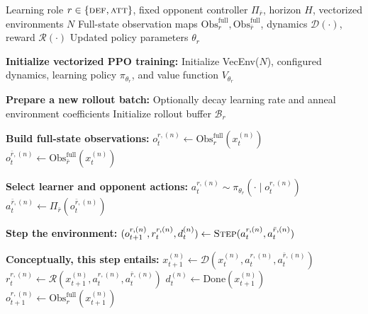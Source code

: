 \begin{algorithm}[H]
\caption{Single-Phase PPO Update with Full-State Observations}
\label{alg:ppo_full_obs}
\begin{algorithmic}[1]
\Require Learning role $r\in\{\textsc{def},\textsc{att}\}$, fixed opponent controller $\Pi_{\bar r}$, horizon $H$, vectorized environments $N$
\Require Full-state observation maps $\mathrm{Obs}^{\mathrm{full}}_r,\mathrm{Obs}^{\mathrm{full}}_{\bar r}$, dynamics $\mathcal{D}(\cdot)$, reward $\mathcal{R}(\cdot)$
\Ensure Updated policy parameters $\theta_r$

\State \textbf{Initialize vectorized PPO training:}
\State \hspace{1em} Initialize VecEnv($N$), configured dynamics, learning policy $\pi_{\theta_r}$, and value function $V_{\theta_r}$

  \State \textbf{Prepare a new rollout batch:}
  \State \hspace{1em} Optionally decay learning rate and anneal environment coefficients
  \State \hspace{1em} Initialize rollout buffer $\mathcal{B}_r$

    \State \textbf{Build full-state observations:}
    \State \hspace{1em} $o_t^{r,(n)} \leftarrow \mathrm{Obs}^{\mathrm{full}}_r(x_t^{(n)})$
    \State \hspace{1em} $o_t^{\bar r,(n)} \leftarrow \mathrm{Obs}^{\mathrm{full}}_{\bar r}(x_t^{(n)})$

    \State \textbf{Select learner and opponent actions:}
    \State \hspace{1em} $a_t^{r,(n)} \sim \pi_{\theta_r}(\cdot \mid o_t^{r,(n)})$
    \State \hspace{1em} $a_t^{\bar r,(n)} \leftarrow \Pi_{\bar r}(o_t^{\bar r,(n)})$

    \State \textbf{Step the environment:}
    \State \hspace{1em} $(o_{t+1}^{r,(n)}, r_t^{r,(n)}, d_t^{(n)}) \leftarrow \textsc{Step}(a_t^{r,(n)}, a_t^{\bar r,(n)})$

    \State \textbf{Conceptually, this step entails:}
    \State \hspace{2em} $x_{t+1}^{(n)} \leftarrow \mathcal{D}\!\left(x_t^{(n)}, a_t^{r,(n)}, a_t^{\bar r,(n)}\right)$
    \State \hspace{2em} $r_t^{r,(n)} \leftarrow \mathcal{R}\!\left(x_{t+1}^{(n)}, a_t^{r,(n)}, a_t^{\bar r,(n)}\right)$
    \State \hspace{2em} $d_t^{(n)} \leftarrow \mathrm{Done}\!\left(x_{t+1}^{(n)}\right)$
    \State \hspace{2em} $o_{t+1}^{r,(n)} \leftarrow \mathrm{Obs}^{\mathrm{full}}_r(x_{t+1}^{(n)})$


\end{algorithmic}
\end{algorithm}
